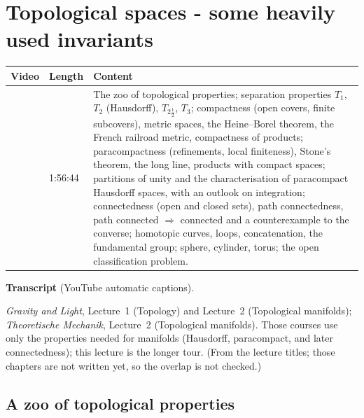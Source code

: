 \chapter{Topological spaces - some heavily used invariants}\label{ch:l05}
\begin{paracol}{2}

\begin{sources}
\begin{tabularx}{\linewidth}{@{}l l L@{}}
\toprule
\textbf{Video} & \textbf{Length} & \textbf{Content}\\
\midrule
{} & 1:56:44 & The zoo of topological properties;
separation properties $T_1$, $T_2$ (Hausdorff), $T_{2\frac12}$, $T_3$; compactness (open covers, finite subcovers), metric
spaces, the Heine--Borel theorem, the French railroad metric, compactness of products; paracompactness (refinements,
local finiteness), Stone's theorem, the long line, products with compact spaces; partitions of unity and the characterisation of
paracompact Hausdorff spaces, with an outlook on integration; connectedness (open and closed sets), path connectedness, path
connected $\Rightarrow$ connected and a counterexample to the converse; homotopic curves, loops, concatenation, the
fundamental group; sphere, cylinder, torus; the open classification problem.\\
\bottomrule
\end{tabularx}

\smallskip
\textbf{Transcript}  (YouTube automatic captions).
\end{sources}

\begin{reading}
\emph{Gravity and Light}, Lecture~1 (Topology) and Lecture~2 (Topological manifolds); \emph{Theoretische Mechanik},
Lecture~2 (Topological manifolds). Those courses use only the properties needed for manifolds (Hausdorff,
paracompact, and later connectedness); this lecture is the longer tour. (From the lecture titles; those chapters are not written
yet, so the overlap is not checked.)
\end{reading}

\section{A zoo of topological properties}\label{sec:iv-zoo}


\end{paracol}
